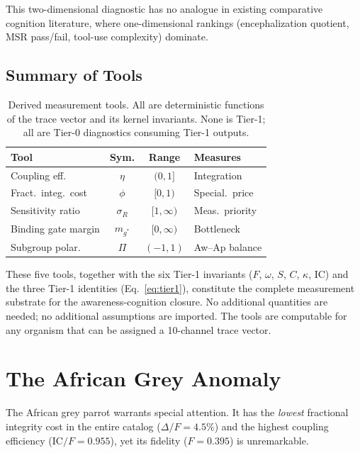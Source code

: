\documentclass[
  aps,
  prd,
  twocolumn,
  superscriptaddress,
  nofootinbib,
  floatfix
]{revtex4-2}
\newcommand{\IC}{\mathrm{IC}}
\newcommand{\DeltaF}{\Delta\!/\!F}
\begin{document}
This two-dimensional diagnostic has no analogue in
existing comparative cognition literature, where
one-dimensional rankings (encephalization quotient,
MSR pass/fail, tool-use complexity) dominate.

\subsection{Summary of Tools}

\begin{table}[h]
\caption{\label{tab:tools}Derived measurement tools.
All are deterministic functions of the trace vector and
its kernel invariants.  None is Tier-1; all are Tier-0
diagnostics consuming Tier-1 outputs.}
\small
\begin{ruledtabular}
\begin{tabular}{lccl}
Tool & Sym. & Range & Measures \\
\hline
Coupling eff. & $\eta$ & $(0,1]$ & Integration \\
Fract.\ integ.\ cost & $\phi$ & $[0,1)$ & Special.\ price \\
Sensitivity ratio & $\sigma_R$ & $[1,\infty)$ & Meas.\ priority \\
Binding gate margin & $m_{g^*}$ & $[0,\infty)$ & Bottleneck \\
Subgroup polar. & $\Pi$ & $(-1,1)$ & Aw--Ap balance \\
\end{tabular}
\end{ruledtabular}
\end{table}

These five tools, together with the six Tier-1 invariants
($F$, $\omega$, $S$, $C$, $\kappa$, $\IC$) and the three
Tier-1 identities (Eq.~\ref{eq:tier1}), constitute the
complete measurement substrate for the awareness-cognition
closure.  No additional quantities are needed; no
additional assumptions are imported.  The tools are
computable for any organism that can be assigned a
10-channel trace vector.

\section{The African Grey Anomaly}\label{sec:anomaly}

The African grey parrot warrants special attention.  It has
the \emph{lowest} fractional integrity cost in the entire
catalog ($\DeltaF = 4.5\%$) and the highest coupling
efficiency ($\IC/F = 0.955$), yet its fidelity ($F = 0.395$)
is unremarkable.
\end{document}

